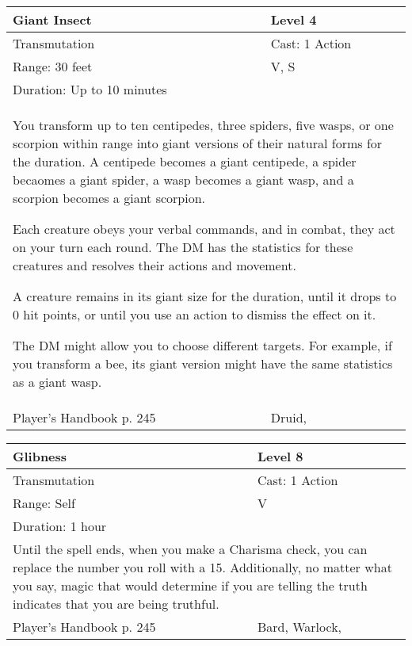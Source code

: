 \documentclass[11pt]{report}
\begin{document}
\begin{table}[H]
	\begin{tabular}{||p{6cm}|p{6cm}||}
		\hline\hline
		\bf{Giant Insect} & Level 4\\ \hline
		Transmutation & Cast: 1 Action\\ \hline
		Range: 30 feet & V, S\\ \hline
		Duration: Up to 10 minutes & \\ \hline
		\multicolumn{2}{||p{12cm}||}{You transform up to ten centipedes, three spiders, five wasps, or one scorpion within range into giant versions of their natural forms for the duration. A centipede becomes a giant centipede, a spider becaomes a giant spider, a wasp becomes a giant wasp, and a scorpion becomes a giant scorpion.

Each creature obeys your verbal commands, and in combat, they act on your turn each round. The DM has the statistics for these creatures and resolves their actions and movement.

A creature remains in its giant size for the duration, until it drops to 0 hit points, or until you use an action to dismiss the effect on it.

The DM might allow you to choose different targets. For example, if you transform a bee, its giant version might have the same statistics as a giant wasp.}\\ \hline
Player's Handbook p. 245 & Druid, \\ \hline\hline
	\end{tabular}
\end{table}

\begin{table}[H]
	\begin{tabular}{||p{6cm}|p{6cm}||}
		\hline\hline
		\bf{Glibness} & Level 8\\ \hline
		Transmutation & Cast: 1 Action\\ \hline
		Range: Self & V\\ \hline
		Duration: 1 hour & \\ \hline
		\multicolumn{2}{||p{12cm}||}{Until the spell ends, when you make a Charisma check, you can replace the number you roll with a 15. Additionally, no matter what you say, magic that would determine if you are telling the truth indicates that you are being truthful.}\\ \hline
Player's Handbook p. 245 & Bard, Warlock, \\ \hline\hline
	\end{tabular}
\end{table}
\end{document}
